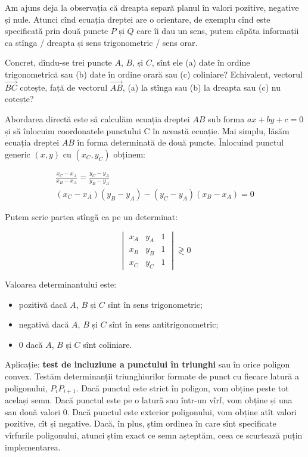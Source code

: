 \documentclass[../main.tex]{subfiles}
\begin{document}
Am ajuns deja la observația că dreapta separă planul în valori pozitive, negative și nule. Atunci cînd ecuația dreptei are o orientare, de exemplu cînd este specificată prin două puncte $P$ și $Q$ care îi dau un sens, putem căpăta informații ca stînga / dreapta și sens trigonometric / sens orar.

Concret, dîndu-se trei puncte $A$, $B$, și $C$, sînt ele (a) date în ordine trigonometrică sau (b) date în ordine orară sau (c) coliniare? Echivalent, vectorul $\vec{BC}$ cotește, față de vectorul $\vec{AB}$, (a) la stînga sau (b) la dreapta sau (c) nu cotește?

Abordarea directă este să calculăm ecuația dreptei $AB$ sub forma $ax + by + c = 0$ și să înlocuim coordonatele punctului C în această ecuație. Mai simplu, lăsăm ecuația dreptei $AB$ în forma determinată de două puncte. Înlocuind punctul generic $(x, y)$ cu $(x_C, y_C)$ obținem:

\begin{gather*}
\frac{x_C - x_A}{x_B - x_A} = \frac{y_C - y_A}{y_B - y_A}\\
(x_C - x_A)(y_B - y_A) - (y_C - y_A)(x_B - x_A) = 0
\end{gather*}

Putem scrie partea stîngă ca pe un determinat:

$$
\begin{vmatrix}
x_A & y_A & 1\\
x_B & y_B & 1 \\
x_C & y_C & 1
\end{vmatrix} \gtrless 0
$$

Valoarea determinantului este:

\begin{itemize}
  \item pozitivă dacă $A$, $B$ și $C$ sînt în sens trigonometric;
  \item negativă dacă $A$, $B$ și $C$ sînt în sens antitrigonometric;
  \item 0 dacă $A$, $B$ și $C$ sînt coliniare.
\end{itemize}

Aplicație: \textbf{test de incluziune a punctului în triunghi} sau în orice poligon convex. Testăm determinanții triunghiurilor formate de punct cu fiecare latură a poligonului, $P_{i}P_{i + 1}$. Dacă punctul este strict în poligon, vom obține peste tot același semn. Dacă punctul este pe o latură sau într-un vîrf, vom obține și una sau două valori 0. Dacă punctul este exterior poligonului, vom obține atît valori pozitive, cît și negative. Dacă, în plus, știm ordinea în care sînt specificate vîrfurile poligonului, atunci știm exact ce semn așteptăm, ceea ce scurtează puțin implementarea.
\end{document}
